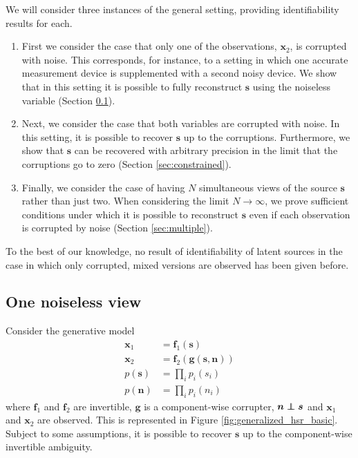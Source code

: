 We will consider three instances of the general setting, providing identifiability results for each.
\begin{enumerate}
	\item First we consider the case that only one of the observations, $\bm{x}_2$, is corrupted with noise. This corresponds, for instance, to a setting in which one accurate measurement device is supplemented with a second noisy device. We show that in this setting it is possible to fully reconstruct $\bm{s}$ using the noiseless variable (Section \ref{sec:onenoisless}).
	\item Next, we consider the case that both variables are corrupted with noise. In this setting, it is possible to recover $\bm{s}$ up to the corruptions.     Furthermore, we show that $\bm{s}$ can be recovered with arbitrary precision in the limit that the corruptions go to zero (Section \ref{sec:constrained}).
	\item Finally, we consider the case of having $N$ simultaneous views of the source $\bm{s}$ rather than just two.
	When considering the limit $N \rightarrow \infty$, we prove sufficient conditions under which it is possible to reconstruct $\bm{s}$ even if each observation is corrupted by noise (Section \ref{sec:multiple}).
\end{enumerate}

To the best of our knowledge, no result of identifiability of latent sources in the case in which only corrupted, mixed versions are observed has been given before.



\subsection{One noiseless view}
\label{sec:onenoisless}
Consider the generative model
\begin{align}
\bm{x}_{1}&=\bm{f}_{1}(\bm{s}) \label{eq:sem2_1}\\
\bm{x}_{2}&=\bm{f}_{2}(\bm{g}(\bm{s}, \bm{n})) \label{eq:sem2_2} \\
p(\bm{s}) &= \prod_{i} p_i(s_i) \nonumber \\
p(\bm{n}) &= \prod_{i} p_i(n_i) \label{eq:indep}
\end{align}
where $\bm{f}_1$ and $\bm{f}_2$ are invertible, $\bm{g}$ is a component-wise corrupter, $\bm{n} \independent \bm{s}$ and $\bm{x}_1$ and $\bm{x}_2$ are observed.
This is represented in Figure \ref{fig:generalized_hsr_basic}.
Subject to some assumptions, it is possible to recover $\bm{s}$ up to the
component-wise invertible ambiguity.

